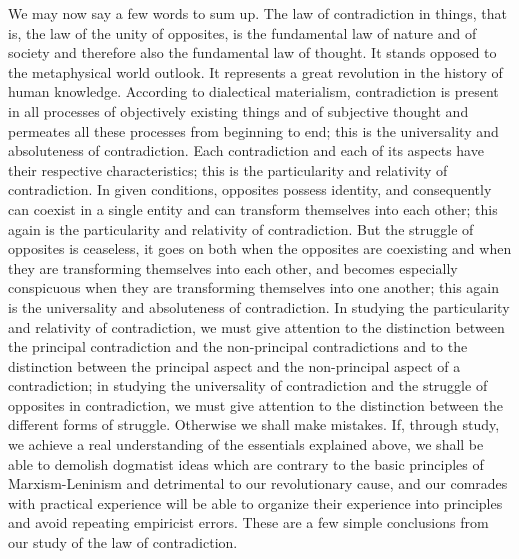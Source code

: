 \documentclass{article}
\begin{document}
We may now say a few words to sum up. The law of contradiction in things, that
is, the law of the unity of opposites, is the fundamental law of nature and of
society and therefore also the fundamental law of thought. It stands opposed to
the metaphysical world outlook. It represents a great revolution in the history
of human knowledge. According to dialectical materialism, contradiction is
present in all processes of objectively existing things and of subjective
thought and permeates all these processes from beginning to end; this is the
universality and absoluteness of contradiction. Each contradiction and each of
its aspects have their respective characteristics; this is the particularity
and relativity of contradiction. In given conditions, opposites possess
identity, and consequently can coexist in a single entity and can transform
themselves into each other; this again is the particularity and relativity of
contradiction. But the struggle of opposites is ceaseless, it goes on both when
the opposites are coexisting and when they are transforming themselves into
each other, and becomes especially conspicuous when they are transforming
themselves into one another; this again is the universality and absoluteness of
contradiction. In studying the particularity and relativity of contradiction,
we must give attention to the distinction between the principal contradiction
and the non-principal contradictions and to the distinction between the
principal aspect and the non-principal aspect of a contradiction; in studying
the universality of contradiction and the struggle of opposites in
contradiction, we must give attention to the distinction between the different
forms of struggle. Otherwise we shall make mistakes. If, through study, we
achieve a real understanding of the essentials explained above, we shall be
able to demolish dogmatist ideas which are contrary to the basic principles of
Marxism-Leninism and detrimental to our revolutionary cause, and our comrades
with practical experience will be able to organize their experience into
principles and avoid repeating empiricist errors. These are a few simple
conclusions from our study of the law of contradiction.
\end{document}
